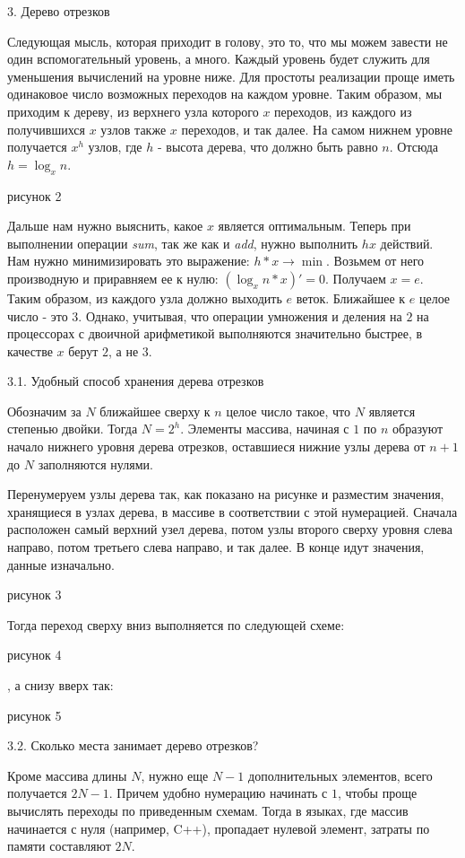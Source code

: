 \documentclass[11pt,a4paper,oneside]{article}
\begin{document}
3. Дерево отрезков

Следующая мысль, которая приходит в голову, это то, что мы можем завести не 
один вспомогательный уровень, а много. Каждый уровень будет служить для 
уменьшения вычислений на уровне ниже. Для простоты реализации проще иметь 
одинаковое число возможных переходов на каждом уровне. Таким образом, мы 
приходим к дереву, из верхнего узла которого $x$ переходов, из каждого из 
получившихся $x$ узлов также $x$ переходов, и так далее. На самом нижнем 
уровне получается $x^{h}$ узлов, где $h$ - высота дерева, что должно быть 
равно $n$. Отсюда $h = \log_{x}n$.

рисунок 2

Дальше нам нужно выяснить, какое $x$ является оптимальным. Теперь при 
выполнении операции {\it sum}, так же как и {\it add}, нужно выполнить 
$hx$ действий. Нам нужно минимизировать это выражение: $h * x\to\min$. 
Возьмем от него производную и приравняем ее к нулю: 
$(\log_{x}n * x)' = 0$. Получаем $x = e$. Таким образом, из каждого узла 
должно выходить $e$ веток. Ближайшее к $e$ целое число - это $3$. Однако, 
учитывая, что операции умножения и деления на $2$ на процессорах с 
двоичной арифметикой выполняются значительно быстрее, в качестве $x$ 
берут $2$, а не $3$.

3.1. Удобный способ хранения дерева отрезков

Обозначим за $N$ ближайшее сверху к $n$ целое число такое, что $N$ является степенью двойки. Тогда $N = 2^{h}$. Элементы массива, начиная с $1$ по $n$ образуют начало нижнего уровня дерева отрезков, оставшиеся нижние узлы дерева от $n + 1$ до $N$ заполняются нулями. 

Перенумеруем узлы дерева так, как показано на рисунке и разместим 
значения, хранящиеся в узлах дерева, в массиве в соответствии с этой 
нумерацией. Сначала расположен самый верхний узел дерева, потом узлы
второго сверху уровня слева направо, потом третьего слева направо, и 
так далее. В конце идут значения, данные изначально. 

рисунок 3

Тогда переход сверху вниз выполняется по следующей схеме:

рисунок 4

, а снизу вверх так:

рисунок 5

3.2. Сколько места занимает дерево отрезков?

Кроме массива длины $N$, нужно еще $N - 1$ дополнительных 
элементов, всего получается $2N - 1$. Причем удобно нумерацию 
начинать с $1$, чтобы проще 
вычислять переходы по приведенным схемам. Тогда в языках, где 
массив начинается с нуля (например, C++), пропадает нулевой элемент, 
затраты по памяти составляют $2N$.
\end{document}
